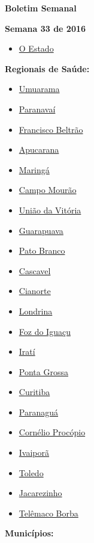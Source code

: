 \documentclass[10pt]{article} %
\begin{document}
\begin{minipage}[t]{.30\linewidth} %
\begin{mdframed}[style=sidebar,frametitle={}] %


\hypertarget{contents}{\textbf{{\large Boletim Semanal}}} 

\textbf{Semana 33 de 2016} %

\begin{itemize}
\item \hyperlink{estado}{O Estado} 
\end{itemize}


\textbf{Regionais de Saúde:}


\begin{itemize}\item \hyperlink{Umrm}{Umuarama}
\item \hyperlink{Prnv}{Paranavaí}
\item \hyperlink{FrnB}{Francisco Beltrão}
\item \hyperlink{Apcr}{Apucarana}
\item \hyperlink{Mrng}{Maringá}
\item \hyperlink{CmpM}{Campo Mourão}
\item \hyperlink{UndV}{União da Vitória}
\item \hyperlink{Grpv}{Guarapuava}
\item \hyperlink{PtBr}{Pato Branco}
\item \hyperlink{Cscv}{Cascavel}
\item \hyperlink{Cnrt}{Cianorte}
\item \hyperlink{Lndr}{Londrina}
\item \hyperlink{FzdI}{Foz do Iguaçu}
\item \hyperlink{Irat}{Iratí}
\item \hyperlink{PntG}{Ponta Grossa}
\item \hyperlink{Crtb}{Curitiba}
\item \hyperlink{Prng}{Paranaguá}
\item \hyperlink{CrnP}{Cornélio Procópio}
\item \hyperlink{Ivpr}{Ivaiporã}
\item \hyperlink{Told}{Toledo}
\item \hyperlink{Jcrz}{Jacarezinho}
\item \hyperlink{TlmB}{Telêmaco Borba}\end{itemize}
\textbf{Municípios:}


\end{mdframed}
\end{minipage}
\end{document}

